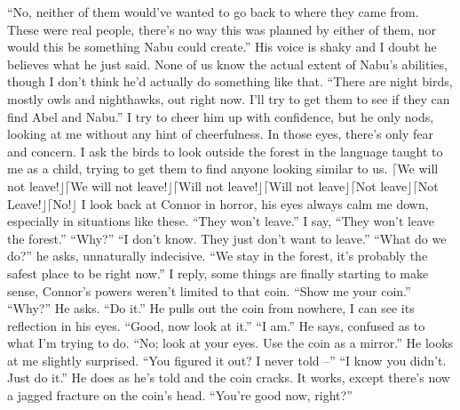 \documentclass[openany, 12pt]{book}
\newcommand\bird[1]{$\lceil$#1$\rfloor$\tab}
\newcommand\tab[1][1cm]{\hspace*{#1}}
\begin{document}
\newline
\tab
``No, neither of them would’ve wanted to go back to where they came from. These were real people, there’s no way this was planned by either of them, nor would this be something Nabu could create.'' His voice is shaky and I doubt he believes what he just said. None of us know the actual extent of Nabu’s abilities, though I don’t think he’d actually do something like that.
\newline
\tab
``There are night birds, mostly owls and nighthawks, out right now. I’ll try to get them to see if they can find Abel and Nabu.'' I try to cheer him up with confidence, but he only nods, looking at me without any hint of cheerfulness. In those eyes, there’s only fear and concern. I ask the birds to look outside the forest in the language taught to me as a child, trying to get them to find anyone looking similar to us.
\newline
\bird{We will not leave!}\bird{We will not leave!}\bird{Will not leave!}\bird{Will not leave}\bird{Not leave}\bird{Not Leave!}\bird{No!}
\newline
\tab
I look back at Connor in horror, his eyes always calm me down, especially in situations like these. ``They won’t leave.'' I say, ``They won’t leave the forest.''
\newline
\tab
``Why?''
\newline
\tab
``I don’t know. They just don’t want to leave.''
\newline
\tab
``What do we do?'' he asks, unnaturally indecisive.
\newline
\tab
``We stay in the forest, it’s probably the safest place to be right now.'' I reply, some things are finally starting to make sense, Connor’s powers weren’t limited to that coin. ``Show me your coin.'' 
\newline
\tab
``Why?'' He asks.
\newline
\tab
``Do it.'' He pulls out the coin from nowhere, I can see its reflection in his eyes. ``Good, now look at it.''
\newline
\tab
``I am.'' He says, confused as to what I’m trying to do.
\newline
\tab
``No; look at your eyes. Use the coin as a mirror.'' He looks at me slightly surprised.
\newline
\tab
``You figured it out? I never told --''
\newline
\tab
``I know you didn’t. Just do it.'' He does as he’s told and the coin cracks. It works, except there’s now a jagged fracture on the coin’s head. ``You’re good now, right?''
\end{document}
